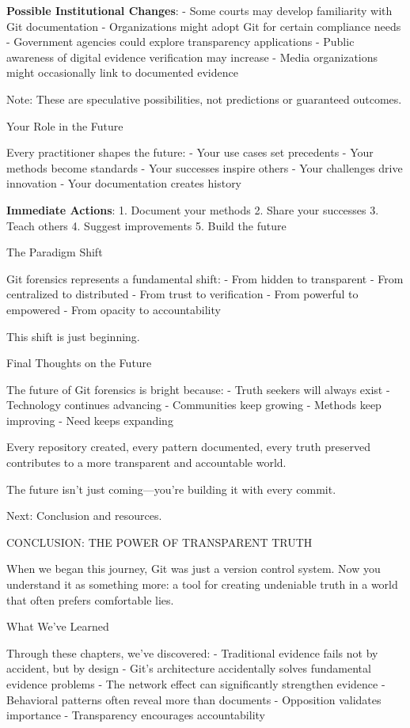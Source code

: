 \textbf{Possible Institutional Changes}: - Some courts may develop
familiarity with Git documentation - Organizations might adopt Git for
certain compliance needs - Government agencies could explore
transparency applications - Public awareness of digital evidence
verification may increase - Media organizations might occasionally link
to documented evidence

Note: These are speculative possibilities, not predictions or guaranteed
outcomes.

Your Role in the Future

Every practitioner shapes the future: - Your use cases set precedents -
Your methods become standards - Your successes inspire others - Your
challenges drive innovation - Your documentation creates history

\textbf{Immediate Actions}: 1. Document your methods 2. Share your
successes 3. Teach others 4. Suggest improvements 5. Build the future

The Paradigm Shift

Git forensics represents a fundamental shift: - From hidden to
transparent - From centralized to distributed - From trust to
verification - From powerful to empowered - From opacity to
accountability

This shift is just beginning.

Final Thoughts on the Future

The future of Git forensics is bright because: - Truth seekers will
always exist - Technology continues advancing - Communities keep growing
- Methods keep improving - Need keeps expanding

Every repository created, every pattern documented, every truth
preserved contributes to a more transparent and accountable world.

The future isn't just coming---you're building it with every commit.

Next: Conclusion and resources.

CONCLUSION: THE POWER OF TRANSPARENT TRUTH

When we began this journey, Git was just a version control system. Now
you understand it as something more: a tool for creating undeniable
truth in a world that often prefers comfortable lies.

What We've Learned

Through these chapters, we've discovered: - Traditional evidence fails
not by accident, but by design - Git's architecture accidentally solves
fundamental evidence problems - The network effect can significantly
strengthen evidence - Behavioral patterns often reveal more than
documents - Opposition validates importance - Transparency encourages
accountability

